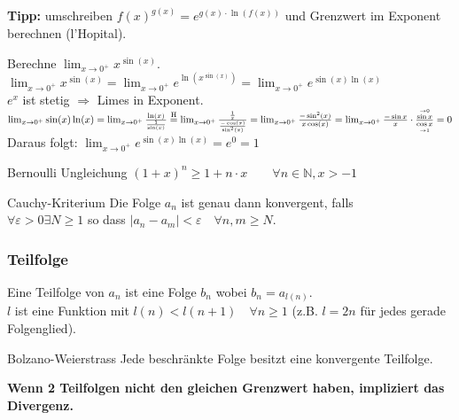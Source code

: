 \documentclass[a4paper,fontsize = 7pt]{scrartcl}
\def\N{\mathbb{N}}
\begin{document}
\textbf{Tipp:} umschreiben $f(x)^{g(x)} = e^{g(x) \cdot \ln \left( f(x) \right)}$ und Grenzwert im Exponent berechnen (l'Hopital).
\begin{subbox}{	Berechne $\lim_{x \to 0^+} x^{\sin(x)}$.}
  \vspace{-6pt}
		$\lim_{x \to 0^+} x^{\sin(x)} = \lim_{x \to 0^+} e^{ \ln \left( x^{\sin(x)} \right)} 
    = \lim_{x \to 0^+} e^{\sin (x) \ln (x)}$
	\\$e^x$ ist stetig $\Rightarrow$ Limes in Exponent.
	$
		\lim_{x \to 0^+} \sin(x) \ln(x) = \lim_{x \to 0^+} \frac{\ln(x)}{\frac{1}{\sin(x)}}
		\\\overset{\text{H}}{=} \lim_{x \to 0^+} \frac{\frac{1}{x}}{\frac{-\cos (x)}{\sin^2 (x)}} = \lim_{x \to0^+} \frac{- \sin^2 (x)}{x \cos (x)}\\
						= \lim_{x \to 0^+} \frac{- \sin x}{x} \cdot \frac{\overset{\to 0}{\sin x}}{\underset{\to 1}{\cos x}} = 0
	$
	\\Daraus folgt: $\lim_{x \to 0^+} e^{\sin (x) \ln (x)} = e^0 = 1$
  \vspace{-4pt}
\end{subbox}

\begin{mainbox}{Bernoulli Ungleichung}
  \vspace{-4pt}
  $(1 + x)^n \geq 1 + n \cdot x \qquad \forall n \in \N, x > -1$
  \vspace{-4pt}
\end{mainbox}

\begin{mainbox}{Cauchy-Kriterium}
  \vspace{-4pt}
Die Folge $a_n$ ist genau dann konvergent, falls \\ $\forall \varepsilon > 0 \exists N \ge 1$ so dass $| a_n - a_m | < \varepsilon \quad \forall n,m \ge N$.
  \vspace{-4pt}
\end{mainbox}

\subsubsection{Teilfolge}
Eine Teilfolge von $a_n$ ist eine Folge $b_n$ wobei $b_n = a_{l(n)}$.
\\ $l$ ist eine Funktion mit $l(n) < l(n+1) \quad \forall n \ge 1$ (z.B. $l = 2n$ für jedes gerade Folgenglied). 

\begin{subbox}{Bolzano-Weierstrass}
Jede beschränkte Folge besitzt eine konvergente Teilfolge.
\end{subbox}
 \textbf{Wenn 2 Teilfolgen nicht den gleichen Grenzwert haben, impliziert das Divergenz.}
\end{document}
